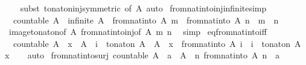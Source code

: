 \begin{isabellebody}
%
\isadelimproof
\ \ %
\endisadelimproof
%
\isatagproof
{}\isamarkupfalse%
\ {\isacharparenleft}subst\ to{\isacharunderscore}nat{\isacharunderscore}on{\isacharunderscore}inj{\isacharbrackleft}symmetric{\isacharcomma}\ of\ A{\isacharbrackright}{\isacharparenright}\ auto%
\endisatagproof
{\isafoldproof}%
%
\isadelimproof
\isanewline
%
\endisadelimproof
\isanewline
{}\isamarkupfalse%
\ from{\isacharunderscore}nat{\isacharunderscore}into{\isacharunderscore}inj{\isacharunderscore}infinite{\isacharbrackleft}simp{\isacharbrackright}{\isacharcolon}\isanewline
\ \ {\isachardoublequoteopen}countable\ A\ {\isasymLongrightarrow}\ infinite\ A\ {\isasymLongrightarrow}\ from{\isacharunderscore}nat{\isacharunderscore}into\ A\ m\ {\isacharequal}\ from{\isacharunderscore}nat{\isacharunderscore}into\ A\ n\ {\isasymlongleftrightarrow}\ m\ {\isacharequal}\ n{\isachardoublequoteclose}\isanewline
%
\isadelimproof
\ \ %
\endisadelimproof
%
\isatagproof
{}\isamarkupfalse%
\ image{\isacharunderscore}to{\isacharunderscore}nat{\isacharunderscore}on{\isacharbrackleft}of\ A{\isacharbrackright}\ from{\isacharunderscore}nat{\isacharunderscore}into{\isacharunderscore}inj{\isacharbrackleft}of\ A\ m\ n{\isacharbrackright}\ \isamarkupfalse%
\ simp%
\endisatagproof
{\isafoldproof}%
%
\isadelimproof
\isanewline
%
\endisadelimproof
\isanewline
{}\isamarkupfalse%
\ eq{\isacharunderscore}from{\isacharunderscore}nat{\isacharunderscore}into{\isacharunderscore}iff{\isacharcolon}\isanewline
\ \ {\isachardoublequoteopen}countable\ A\ {\isasymLongrightarrow}\ x\ {\isasymin}\ A\ {\isasymLongrightarrow}\ i\ {\isasymin}\ to{\isacharunderscore}nat{\isacharunderscore}on\ A\ {\isacharbackquote}\ A\ {\isasymLongrightarrow}\ x\ {\isacharequal}\ from{\isacharunderscore}nat{\isacharunderscore}into\ A\ i\ {\isasymlongleftrightarrow}\ i\ {\isacharequal}\ to{\isacharunderscore}nat{\isacharunderscore}on\ A\ x{\isachardoublequoteclose}\isanewline
%
\isadelimproof
\ \ %
\endisadelimproof
%
\isatagproof
{}\isamarkupfalse%
\ auto%
\endisatagproof
{\isafoldproof}%
%
\isadelimproof
\isanewline
%
\endisadelimproof
\isanewline
{}\isamarkupfalse%
\ from{\isacharunderscore}nat{\isacharunderscore}into{\isacharunderscore}surj{\isacharcolon}\ {\isachardoublequoteopen}countable\ A\ {\isasymLongrightarrow}\ a\ {\isasymin}\ A\ {\isasymLongrightarrow}\ {\isasymexists}n{\isachardot}\ from{\isacharunderscore}nat{\isacharunderscore}into\ A\ n\ {\isacharequal}\ a{\isachardoublequoteclose}\isanewline
%
\isadelimproof
\ \ %
\endisadelimproof

\end{isabellebody}
